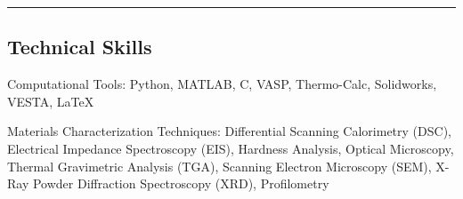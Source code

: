 \documentclass[10pt,letterpaper]{article}
\newenvironment{indentsection}[1]%
{\begin{list}{}%
  {\setlength{\leftmargin}{#1}}%
  \item[]%
}
{\end{list}}
\newcommand{\CPP}
{C\nolinebreak[4]\hspace{-.05em}\raisebox{.22ex}{\footnotesize\bf ++}}
\begin{document}
\hrule
\vspace{-0.6em}
\subsection*{Technical Skills}

\begin{indentsection}{\parindent}
\begin{description*}
  \item[Computational Tools:]
  Python, MATLAB, \CPP, VASP, Thermo-Calc, Solidworks, VESTA, \LaTeX
  \item[Materials Characterization Techniques:]
  Differential Scanning Calorimetry (DSC), Electrical Impedance Spectroscopy (EIS), Hardness Analysis, Optical Microscopy, Thermal Gravimetric Analysis (TGA), Scanning Electron Microscopy (SEM), X-Ray Powder Diffraction Spectroscopy (XRD), Profilometry

\end{description*}
\end{indentsection}
\end{document}
